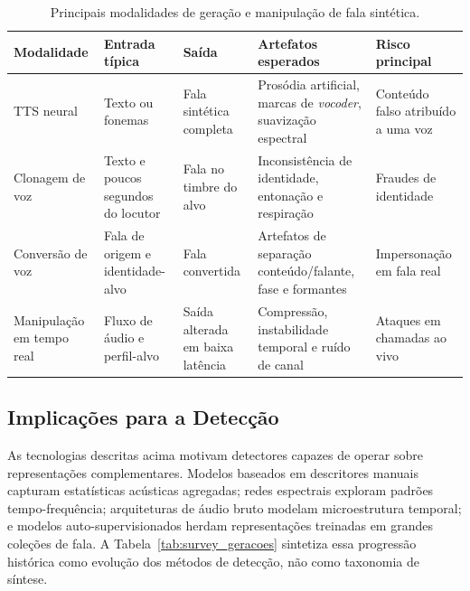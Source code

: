 \documentclass[12pt,a4paper]{article}
\begin{document}
\begin{table}[H]
\centering
\caption{Principais modalidades de geração e manipulação de fala sintética.}
\label{tab:tipos_sintese_ataque}
\footnotesize\singlespacing
\setlength{\tabcolsep}{3pt}
\begin{tabular}{@{}>{\raggedright\arraybackslash}p{2.4cm}
                >{\raggedright\arraybackslash}p{2.7cm}
                >{\raggedright\arraybackslash}p{2.8cm}
                >{\raggedright\arraybackslash}p{3.2cm}
                >{\raggedright\arraybackslash}p{2.6cm}@{}}
\toprule
\textbf{Modalidade} & \textbf{Entrada típica} & \textbf{Saída} &
\textbf{Artefatos esperados} & \textbf{Risco principal} \\
\midrule
TTS neural & Texto ou fonemas & Fala sintética completa &
Prosódia artificial, marcas de \textit{vocoder}, suavização espectral &
Conteúdo falso atribuído a uma voz \\
\addlinespace
Clonagem de voz & Texto e poucos segundos do locutor & Fala no timbre do alvo &
Inconsistência de identidade, entonação e respiração & Fraudes de identidade \\
\addlinespace
Conversão de voz & Fala de origem e identidade-alvo & Fala convertida &
Artefatos de separação conteúdo/falante, fase e formantes & Impersonação em fala real \\
\addlinespace
Manipulação em tempo real & Fluxo de áudio e perfil-alvo & Saída alterada em baixa latência &
Compressão, instabilidade temporal e ruído de canal & Ataques em chamadas ao vivo \\
\bottomrule
\end{tabular}
\end{table}

\subsection{Implicações para a Detecção}

As tecnologias descritas acima motivam detectores capazes de operar sobre
representações complementares. Modelos baseados em descritores manuais capturam
estatísticas acústicas agregadas; redes espectrais exploram padrões
tempo-frequência; arquiteturas de áudio bruto modelam microestrutura temporal;
e modelos auto-supervisionados herdam representações treinadas em grandes
coleções de fala. A Tabela~\ref{tab:survey_geracoes} sintetiza essa progressão
histórica como evolução dos métodos de detecção, não como taxonomia de síntese.
\end{document}
